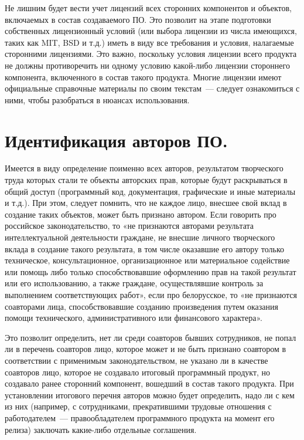 \documentclass[10pt, a5paper]{article}
\begin{document}
Не лишним будет вести учет лицензий всех сторонних компонентов и объектов, включаемых в состав создаваемого ПО. Это позволит на этапе подготовки собственных лицензионный условий (или выбора лицензии из числа имеющихся, таких как MIT, BSD и т.д.) иметь в виду все требования и условия, налагаемые сторонними лицензиями. Это важно, поскольку условия лицензии всего продукта не должны противоречить ни одному условию какой-либо лицензии стороннего компонента, включенного в состав такого продукта. Многие лицензии имеют официальные справочные материалы по своим текстам~--- следует ознакомиться с ними, чтобы разобраться в нюансах использования.

\section*{Идентификация авторов ПО.} 
Имеется в виду определение поименно всех авторов, результатом творческого труда которых стали те объекты авторских прав, которые будут раскрываться в общий доступ (программный код, документация, графические и иные материалы и т.д.). При этом, следует помнить, что не каждое лицо, внесшее свой вклад в создание таких объектов, может быть признано автором. Если говорить про российское законодательство, то «не признаются авторами результата интеллектуальной деятельности граждане, не внесшие личного творческого вклада в создание такого результата, в том числе оказавшие его автору только техническое, консультационное, организационное или материальное содействие или помощь либо только способствовавшие оформлению прав на такой результат или его использованию, а также граждане, осуществлявшие контроль за выполнением соответствующих работ», если про белорусское, то «не признаются соавторами лица, способствовавшие созданию произведения путем оказания помощи технического, административного или финансового характера».

Это позволит определить, нет ли среди соавторов бывших сотрудников, не попал ли в перечень соавторов лицо, которое может и не быть признано соавтором в соответствии с применимым законодательством, не указано ли в качестве соавторов лицо, которое не создавало итоговый программный продукт, но создавало ранее сторонний компонент, вошедший в состав такого продукта. При установлении итогового перечня авторов можно будет определить, надо ли с кем из них (например, с сотрудниками, прекратившими трудовые отношения с работодателем~--- правообладателем программного продукта на момент его релиза) заключать какие-либо отдельные соглашения.
\end{document}
